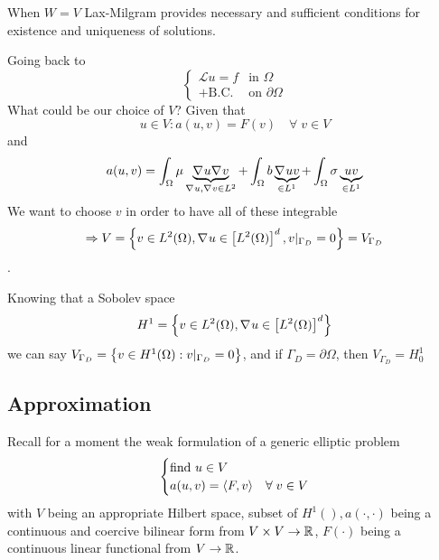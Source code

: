 When \(W=V\) Lax-Milgram provides necessary and sufficient conditions for existence and uniqueness of solutions.

Going back to 
\begin{equation*}
    \begin{cases}
        \mathcal{L}u = f & \text{in }\Omega \\
        + \text{B.C.} & \text{on }\partial\Omega
    \end{cases}
\end{equation*}
What could be our choice of \(V\)? Given that
\[
    u\in V : a(u,v) = F(v) \quad \forall \; v \in V
\]
and 
\[
    a(u,v) = \int_\Omega \mu \underbrace{\nabla\mspace{1mu} u \nabla\mspace{1mu} v}_{\nabla\mspace{1mu} u, \nabla\mspace{1mu} v \in L^2} + \int_\Omega b \underbrace{\nabla\mspace{1mu} u v}_{\in L^1} + \int_\Omega \sigma \underbrace{u v}_{\in L^1}
\]
We want to choose \(v\) in order to have all of these integrable \[\Rightarrow V = \left\{v \in L^2(\Omega), \nabla\mspace{1mu} u \in \left[L^2(\Omega)\right]^d, v\vert_{\Gamma_D} = 0\right\} = V_{\Gamma_D}\].

Knowing that a Sobolev space 
\[
    H^1 = \left\{v \in L^2(\Omega), \nabla\mspace{1mu} u \in \left[L^2(\Omega)\right]^d\right\}
\]
we can say \(V_{\Gamma_D} = \left\{v \in H^1(\Omega): v\vert_{\Gamma_D}= 0\right\}\), and if \(\Gamma_D = \partial\Omega\), then \(V_{\Gamma_D} = H^1_0\)
\subsection{Approximation}
Recall for a moment the weak formulation of a generic elliptic problem 
\begin{equation}
    \begin{cases}
        \text{find } u \in V \\
        a(u,v) = \langle F,v \rangle & \forall \; v \in V \label{Weak Formulation of Boundary Value Problems - 2}
    \end{cases}
\end{equation}
with \(V\) being an appropriate Hilbert space, subset of \(H^1(), a(\cdot,\cdot)\) being a continuous and coercive bilinear form from \(V \times V \to \mathbb{R}\), \(F(\cdot)\) being a continuous linear functional from \(V \to \mathbb{R}\).

